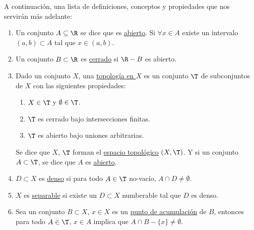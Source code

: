 \begin{defn}
    A continuación, una lista de definiciones, conceptos y propiedades que nos servirán más adelante:
    
    \begin{enumerate}
        \item Un conjunto $A \subseteq \R$ se dice que es \ul{abierto}. Si $\forall x \in A$ existe un intervalo $(a, b) \subset A$ tal que $x \in (a, b)$.
        \item Un conjunto $B \subset \R$ es \ul{cerrado} si $\R - B$ es abierto.
        \item Dado un conjunto $X$, una \ul{topología en $X$} es un conjunto $\T$ de subconjuntos de $X$ con las siguientes propiedades:
        
        \begin{enumerate}
            \item $X \in \T$ y $\emptyset \in \T$.
            \item $\T$ es cerrado bajo intersecciones finitas.
            \item $\T$ es abierto bajo uniones arbitrarias.
        \end{enumerate}
        
        Se dice que $X$, $\T$ forman el \ul{espacio topológico} $(X, \T)$. Y si un conjunto $A \subset \T$, se dice que $A$ es \ul{abierto}.
        \item $D \subset X$ es \ul{denso} si para todo $A \in \T$ no-vacío, $A \cap D \neq \emptyset$.
        \item $X$ es \ul{separable} si existe un $D \subset X$ numberable tal que $D$ es denso.\footnotemark
        \item Sea un conjunto $B \subset X$, $x \in X$ es un \ul{punto de acumulación} de $B$, entonces para todo $A \in \T$, $x \in A$ implica que $A \cap B - \{x\} \neq \emptyset$.
    \end{enumerate}
\end{defn}

